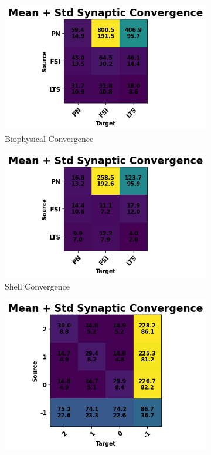 \documentclass[12pt, letterpaper]{article}
\begin{document}
\begin{figure}[H]
    \centering
    \begin{subfigure}{.5\textwidth}
      \centering
      \includegraphics[width=\linewidth]{connections/bio-connvergence}
      \caption{Biophysical Convergence}
      \label{fig:sub1}
    \end{subfigure}
    \begin{subfigure}{.5\textwidth}
      \centering
      \includegraphics[width=\linewidth]{connections/shell-convergence}
      \caption{Shell Convergence}
      \label{fig:sub2}
    \end{subfigure}
    \begin{subfigure}{.5\textwidth}
      \centering
      \includegraphics[width=\linewidth]{connections/assembly-convergence}

\end{subfigure}
\end{figure}
\end{document}
